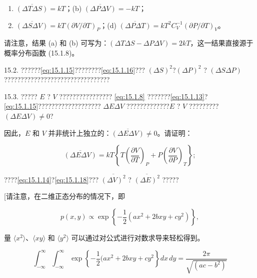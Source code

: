 \begin{enumerate}
\def\labelenumi{(\alph{enumi})}
\item
  \(\overline{(\Delta T \Delta S)} = kT\)；(b) \(\overline{(\Delta P \Delta V)} = -kT\)；
\item
  \(\overline{(\Delta S \Delta V)} = kT(\partial V / \partial T)_{P}\)；(d) \(\overline{(\Delta P \Delta T)} = kT^{2} C_{V}^{-1} (\partial P / \partial T)_{V}\)。
\end{enumerate}

请注意，结果 (a) 和 (b) 可写为：\((\Delta T\Delta S - \Delta P\Delta V) = 2kT\)，这一结果直接源于概率分布函数 (15.1.8)。

15.2. ??????\autoref{eq:15.1.15}????????\autoref{eq:15.1.16}??? \((\Delta S)^2\)?\((\Delta P)^2\) ? \((\Delta S\Delta P)\) ????????????????????????????????

15.3. ????? \(E\) ? \(V\) ???????????????? \autoref{eq:15.1.8} ???????\autoref{eq:15.1.13}?\autoref{eq:15.1.15}??????????????????? \(\Delta E \Delta V\) ?????????????\(E\) ? \(V\) ?????????\((\Delta E \Delta V) \neq 0\)?

因此，\(E\) 和 \(V\) 并非统计上独立的：\(\overline{(\Delta E \Delta V)} \neq 0\)。请证明：

\begin{equation}\tag{15.6.62}\label{eq:15.6.62}
\overline { { ( \Delta E \Delta V ) } } = k T \left\{ T \left( \frac { \partial V } { \partial T } \right) _ { P } + P \left( \frac { \partial V } { \partial P } \right) _ { T } \right\} ;
\end{equation}

????\autoref{eq:15.1.14}?\autoref{eq:15.1.18}??? \(\overline{(\Delta V)^2}\) ? \(\overline{(\Delta E)^2}\) ?????

{[}请注意，在二维正态分布的情况下，即

\begin{equation}\tag{15.6.63}\label{eq:15.6.63}
p ( x , y ) \propto \exp \left\{ - \frac { 1 } { 2 } ( a x ^{2} + 2 b x y + c y ^{2} ) \right\} ,
\end{equation}

量 \(\langle x^{2}\rangle\)、\(\langle x y\rangle\) 和 \(\langle y^{2}\rangle\) 可以通过对公式进行对数求导来轻松得到。

\begin{equation}\tag{15.6.64}\label{eq:15.6.64}
\int _ { - \infty } ^{\infty}    \int _ { - \infty } ^{\infty} \exp \left\{ - { \frac { 1 } { 2 } } ( a x ^{2} + 2 b x y + c y ^{2} \right\} d x \, d y = { \frac { 2 \pi } { \sqrt { ( a c - b ^{2} ) } } }
\end{equation}

